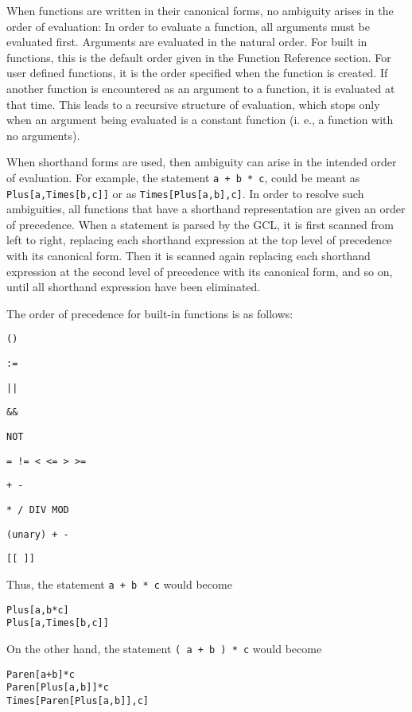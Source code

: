 When functions are written in their canonical forms, no ambiguity
arises in the order of evaluation: In order to evaluate a function,
all arguments must be evaluated first.  Arguments are evaluated in the
natural order.  For built in functions, this is the default order
given in the Function Reference section.  For user defined functions,
it is the order specified when the function is created.  If another
function is encountered as an argument to a function, it is evaluated
at that time.  This leads to a recursive structure of evaluation,
which stops only when an argument being evaluated is a constant
function (i. e., a function with no arguments).

When shorthand forms are used, then ambiguity can arise in the
intended order of evaluation.  For example, the statement \verb&a + b * c&,
could be meant as \verb+Plus[a,Times[b,c]]+ or as
\verb+Times[Plus[a,b],c]+.  In order to resolve such ambiguities, all
functions that have a shorthand representation are given an order of
precedence.  When a statement is parsed by the GCL, it is first
scanned from left to right, replacing each shorthand expression at the
top level of precedence with its canonical form.  Then it is scanned
again replacing each shorthand expression at the second level of
precedence with its canonical form, and so on, until all shorthand
expression have been eliminated.  

The order of precedence for built-in functions is as follows:
\bd
\item
\verb+()+
\item
\verb+:=+
\item
\verb+||+
\item
\verb+&&+
\item
\verb+NOT+
\item
\verb+= != < <= > >=+
\item
\verb&+ -&
\item
\verb+* / DIV MOD+
\item
\verb&(unary) + -&
\item
\verb+[[ ]]+
\ed

Thus, the statement \verb&a + b * c& would become 
\begin{verbatim}
Plus[a,b*c]
Plus[a,Times[b,c]]
\end{verbatim}

\noindent
On the other hand, the statement \verb&( a + b ) * c& would become 
\begin{verbatim}
Paren[a+b]*c
Paren[Plus[a,b]]*c
Times[Paren[Plus[a,b]],c]
\end{verbatim}

